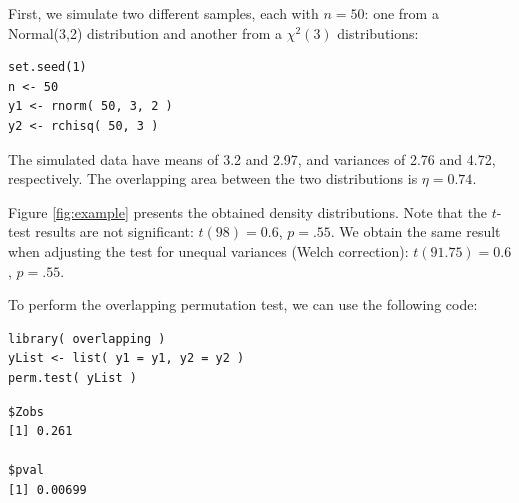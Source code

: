 \documentclass[twocolumn]{article}\usepackage[]{graphicx}\usepackage[]{xcolor}
\makeatletter
\newenvironment{kframe}{%
 \def\at@end@of@kframe{}%
 \ifinner\ifhmode%
  \def\at@end@of@kframe{\end{minipage}}%
  \begin{minipage}{\columnwidth}%
 \fi\fi%
 \def\FrameCommand##1{\hskip\@totalleftmargin \hskip-\fboxsep
 \colorbox{shadecolor}{##1}\hskip-\fboxsep
     \hskip-\linewidth \hskip-\@totalleftmargin \hskip\columnwidth}%
 \MakeFramed {\advance\hsize-\width
   \@totalleftmargin\z@ \linewidth\hsize
   \@setminipage}}%
 {\par\unskip\endMakeFramed%
 \at@end@of@kframe}
\newenvironment{knitrout}{}{} %
\makeatother
\begin{document}
First, we simulate two different samples, each with $n = 50$: one from a Normal(3,2) distribution and another from a $\chi^2(3)$ distributions:
\begin{knitrout}
\color{fgcolor}\begin{kframe}
\begin{verbatim}
set.seed(1) 
n <- 50 
y1 <- rnorm( 50, 3, 2 ) 
y2 <- rchisq( 50, 3 ) 
\end{verbatim}
\end{kframe}
\end{knitrout}

The simulated data have means of  3.2 and 2.97, and variances of 2.76 and 4.72, respectively. The overlapping area between the two distributions is $\eta = 0.74$. 

Figure \ref{fig:example} presents the obtained density distributions. Note that the $t$-test results are not significant: $t(98) = 0.6$, $p = .55$. We obtain the same result when adjusting the test for unequal variances (Welch correction): $t(91.75) = 0.6$, $p = .55$.

To perform the overlapping permutation test, we can use the following code:
\begin{knitrout}
\color{fgcolor}\begin{kframe}
\begin{verbatim}
library( overlapping ) 
yList <- list( y1 = y1, y2 = y2 ) 
perm.test( yList ) 
\end{verbatim}
\end{kframe} 
\begin{kframe}\begin{verbatim}
$Zobs
[1] 0.261

$pval
[1] 0.00699
\end{verbatim}
\end{kframe}
\end{knitrout}
\end{document}
